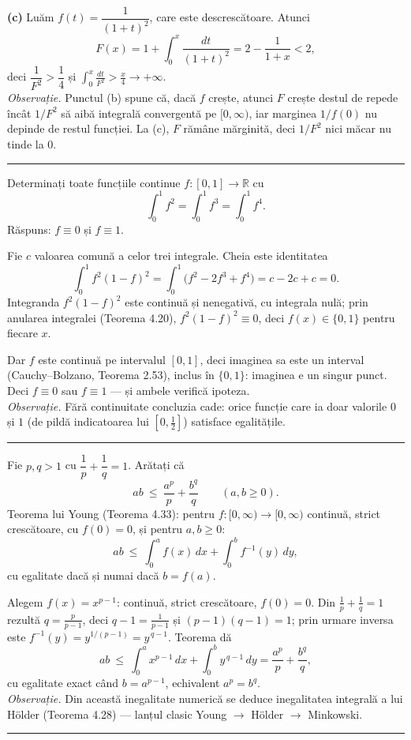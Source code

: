\noindent\textbf{(c)} Luăm $f(t)=\dfrac{1}{(1+t)^2}$, care este descrescătoare.
Atunci
\[ F(x)=1+\int_0^{x}\frac{dt}{(1+t)^2}=2-\frac{1}{1+x}<2, \]
deci $\dfrac{1}{F^2}>\dfrac14$ și
$\displaystyle\int_0^{x}\frac{dt}{F^2}>\frac{x}{4}\to+\infty$.\\[2pt]
\emph{Observație.} Punctul (b) spune că, dacă $f$ crește, atunci $F$ crește destul
de repede încât $1/F^2$ să aibă integrală convergentă pe $[0,\infty)$, iar marginea
$1/f(0)$ nu depinde de restul funcției. La (c), $F$ rămâne mărginită, deci $1/F^2$
nici măcar nu tinde la $0$.
\vspace{1mm}\hrule

Determinați toate funcțiile continue $f:[0,1]\to\mathbb{R}$ cu
\[ \int_0^1f^2=\int_0^1f^3=\int_0^1f^4 . \]
\sol Răspuns: $f\equiv0$ și $f\equiv1$.

Fie $c$ valoarea comună a celor trei integrale. Cheia este identitatea
\[ \int_0^1f^2(1-f)^2=\int_0^1\bigl(f^2-2f^3+f^4\bigr)=c-2c+c=0 . \]
Integranda $f^2(1-f)^2$ este continuă și nenegativă, cu integrala nulă; prin anularea integralei (Teorema 4.20), $f^2(1-f)^2\equiv0$, deci $f(x)\in\{0,1\}$ pentru fiecare $x$.

Dar $f$ este continuă pe intervalul $[0,1]$, deci imaginea sa este un interval (Cauchy--Bolzano, Teorema 2.53), inclus în $\{0,1\}$: imaginea e un singur punct. Deci $f\equiv0$ sau $f\equiv1$ --- și ambele verifică ipoteza.\\[2pt]
\emph{Observație.} Fără continuitate concluzia cade: orice funcție care ia doar valorile $0$ și $1$ (de pildă indicatoarea lui $[0,\frac12]$) satisface egalitățile.
\vspace{1mm}\hrule

Fie $p,q>1$ cu $\dfrac1p+\dfrac1q=1$. Arătați că
\[ ab\ \le\ \frac{a^p}{p}+\frac{b^q}{q}\qquad(a,b\ge0). \]
\sol Teorema lui Young (Teorema 4.33): pentru $f:[0,\infty)\to[0,\infty)$ continuă, strict crescătoare, cu $f(0)=0$, și pentru $a,b\ge0$:
\[ ab\ \le\ \int_0^af(x)\,dx+\int_0^bf^{-1}(y)\,dy , \]
cu egalitate dacă și numai dacă $b=f(a)$.

Alegem $f(x)=x^{p-1}$: continuă, strict crescătoare, $f(0)=0$. Din $\frac1p+\frac1q=1$ rezultă $q=\frac{p}{p-1}$, deci $q-1=\frac1{p-1}$ și $(p-1)(q-1)=1$; prin urmare inversa este $f^{-1}(y)=y^{1/(p-1)}=y^{\,q-1}$. Teorema dă
\[ ab\ \le\ \int_0^ax^{p-1}\,dx+\int_0^by^{\,q-1}\,dy=\frac{a^p}{p}+\frac{b^q}{q}, \]
cu egalitate exact când $b=a^{p-1}$, echivalent $a^p=b^q$.\\[2pt]
\emph{Observație.} Din această inegalitate numerică se deduce inegalitatea integrală a lui Hölder (Teorema 4.28) --- lanțul clasic Young $\to$ Hölder $\to$ Minkowski.
\vspace{1mm}\hrule


